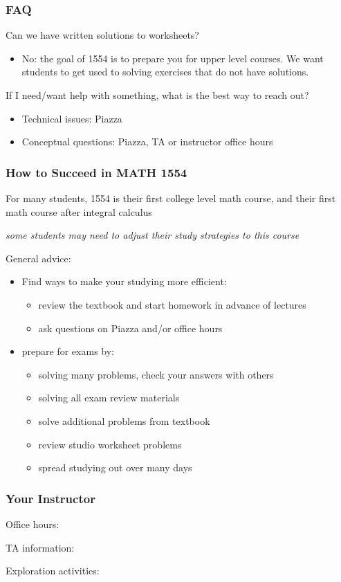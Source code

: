 \documentclass[xcolor=table,11pt,notes=hide,t,handout]{beamer}
\begin{document}
\begin{frame}\frametitle{FAQ}

    Can we have written solutions to worksheets? 
    \begin{itemize}
        \item No: the goal of 1554 is to prepare you for upper level courses. We want students to get used to solving exercises that do not have solutions. 
    \end{itemize}
    If I need/want help with something, what is the best way to reach out? 
    \begin{itemize}
        \item Technical issues: Piazza
        \item Conceptual questions: Piazza, TA or instructor office hours
    \end{itemize}

\end{frame}



\begin{frame}\frametitle{How to Succeed in MATH 1554}

    For many students, 1554 is their first college level math course, and their first math course after integral calculus 
    \begin{center}
    	\textit{some students may need to adjust their study strategies to this course}
	\end{center}
    General advice:
    \begin{itemize}
        \item Find ways to make your studying more efficient:
        \begin{itemize}
            \item review the textbook and start homework in advance of lectures
            \item ask questions on Piazza and/or office hours
        \end{itemize}
        \item prepare for exams by:
        \begin{itemize}
            \item solving many problems, check your answers with others
            \item solving all exam review materials
            \item solve additional problems from textbook
            \item review studio worksheet problems
            \item spread studying out over many days
        \end{itemize}
        
    \end{itemize}


\end{frame}








\begin{frame}\frametitle{Your Instructor}

    Office hours: \\
    \vspace{24pt}
    
    TA information: \\
    \vspace{24pt}
    
    Exploration activities: 

\end{frame}
\end{document}
